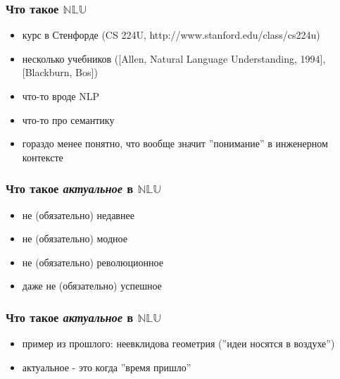 \documentclass{beamer}
\begin{document}
\begin{frame}[fragile]
\frametitle{Что такое $\mathbb{NLU}$}
\begin{itemize}
  \item курс в Стенфорде ({\scriptsize CS 224U, http://www.stanford.edu/class/cs224u})     
  \item несколько учебников ({\scriptsize [Allen, Natural Language Understanding, 1994], [Blackburn, Bos]})
  \item что-то вроде NLP
  \item что-то про семантику 
  \item гораздо менее понятно, что вообще значит ''понимание'' в инженерном контексте
\end{itemize}
\end{frame}

\begin{frame}[fragile]
\frametitle{Что такое \textit{актуальное} в $\mathbb{NLU}$}
\begin{itemize}
  \item не (обязательно) недавнее
  \item не (обязательно) модное
  \item не (обязательно) революционное
  \item даже не (обязательно) успешное
\end{itemize}
\end{frame}

\begin{frame}[fragile]
\frametitle{Что такое \textit{актуальное} в $\mathbb{NLU}$}
\begin{itemize}
  \item пример из прошлого: неевклидова геометрия (''идеи носятся в воздухе'')
  \item актуальное - это когда ''время пришло''
\end{itemize}
\end{frame}
\end{document}
